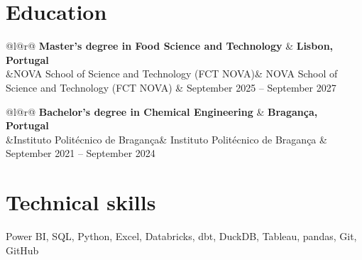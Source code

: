 \documentclass[10pt,a4paper]{article}
\makeatletter
\newcommand{\resumeSubheading}[4]{%
    \noindent%
    \begin{tabular*}{\textwidth}{@{}l@{\extracolsep{\fill}}r@{}}
        \textbf{#1} & \textbf{#3} \\
        \ifx&#2& \else #2 \fi & #4 \\
    \end{tabular*}%
    \vspace{-2pt}%
}
\makeatother
\begin{document}
\section{Education}

\resumeSubheading
    {Master's degree in Food Science and Technology}{NOVA School of Science and Technology (FCT NOVA)}
    {Lisbon, Portugal}{September 2025 -- September 2027}

\vspace{2pt}

\resumeSubheading
    {Bachelor's degree in Chemical Engineering}{Instituto Polit\'ecnico de Bragan\c{c}a}
    {Bragan\c{c}a, Portugal}{September 2021 -- September 2024}

\section{Technical skills}

Power BI, SQL, Python, Excel, Databricks, dbt, DuckDB, Tableau, pandas, Git, GitHub
\end{document}
